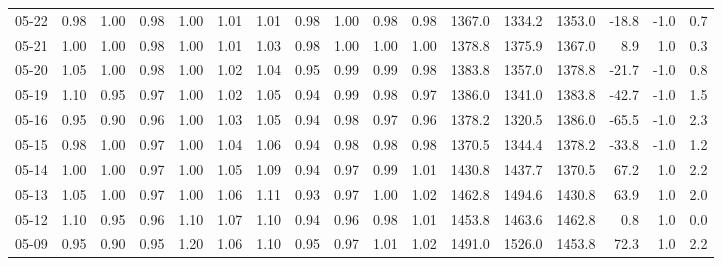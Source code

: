 \begin{threeparttable}
{\begin{tabular}{lrrrrrrrrrrrrrrrr}
  05-22 &   0.98 &   1.00 &         0.98 &     1.00 &           1.01 &        1.01 &        0.98 &        1.00 &          0.98 &          0.98 & 1367.0 & 1334.2 & 1353.0 &      -18.8 &                     -1.0 &                 0.7 \\
  05-21 &   1.00 &   1.00 &         0.98 &     1.00 &           1.01 &        1.03 &        0.98 &        1.00 &          1.00 &          1.00 & 1378.8 & 1375.9 & 1367.0 &        8.9 &                      1.0 &                 0.3 \\
  05-20 &   1.05 &   1.00 &         0.98 &     1.00 &           1.02 &        1.04 &        0.95 &        0.99 &          0.99 &          0.98 & 1383.8 & 1357.0 & 1378.8 &      -21.7 &                     -1.0 &                 0.8 \\
  05-19 &   1.10 &   0.95 &         0.97 &     1.00 &           1.02 &        1.05 &        0.94 &        0.99 &          0.98 &          0.97 & 1386.0 & 1341.0 & 1383.8 &      -42.7 &                     -1.0 &                 1.5 \\
  05-16 &   0.95 &   0.90 &         0.96 &     1.00 &           1.03 &        1.05 &        0.94 &        0.98 &          0.97 &          0.96 & 1378.2 & 1320.5 & 1386.0 &      -65.5 &                     -1.0 &                 2.3 \\
  05-15 &   0.98 &   1.00 &         0.97 &     1.00 &           1.04 &        1.06 &        0.94 &        0.98 &          0.98 &          0.98 & 1370.5 & 1344.4 & 1378.2 &      -33.8 &                     -1.0 &                 1.2 \\
  05-14 &   1.00 &   1.00 &         0.97 &     1.00 &           1.05 &        1.09 &        0.94 &        0.97 &          0.99 &          1.01 & 1430.8 & 1437.7 & 1370.5 &       67.2 &                      1.0 &                 2.2 \\
  05-13 &   1.05 &   1.00 &         0.97 &     1.00 &           1.06 &        1.11 &        0.93 &        0.97 &          1.00 &          1.02 & 1462.8 & 1494.6 & 1430.8 &       63.9 &                      1.0 &                 2.0 \\
  05-12 &   1.10 &   0.95 &         0.96 &     1.10 &           1.07 &        1.10 &        0.94 &        0.96 &          0.98 &          1.01 & 1453.8 & 1463.6 & 1462.8 &        0.8 &                      1.0 &                 0.0 \\
  05-09 &   0.95 &   0.90 &         0.95 &     1.20 &           1.06 &        1.10 &        0.95 &        0.97 &          1.01 &          1.02 & 1491.0 & 1526.0 & 1453.8 &       72.3 &                      1.0 &                 2.2 \\

\end{tabular}}
\end{threeparttable}
